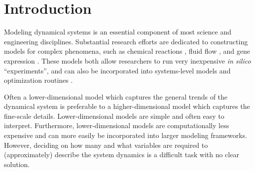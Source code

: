 

\chapter{Introduction\label{ch:intro}}

Modeling dynamical systems is an essential component of most science and engineering disciplines. 
%
Substantial research efforts are dedicated to constructing models for complex phenomena, such as chemical reactions \cite{dong2007simplification, gillespie1977exact, gallagher1986combined}, fluid flow \cite{anderson1995computational}, and gene expression \cite{bar2004analyzing, storey2005significance}. 
%
These models both allow researchers to run very inexpensive {\em in silico} ``experiments'', and can also be incorporated into systems-level models and optimization routines \cite{daoutidis2013engineering, oluwole2006rigorous, rubert2014advanced}. 

Often a lower-dimensional model which captures the general trends of the dynamical system is preferable to a higher-dimensional model which captures the fine-scale details. 
%
Lower-dimensional models are simple and often easy to interpret.
%
Furthermore, lower-dimensional models are computationally less expensive and can more easily be incorporated into larger modeling frameworks. 
%
However, deciding on how many and what variables are required to (approximately) describe the system dynamics is a difficult task with no clear solution. 





